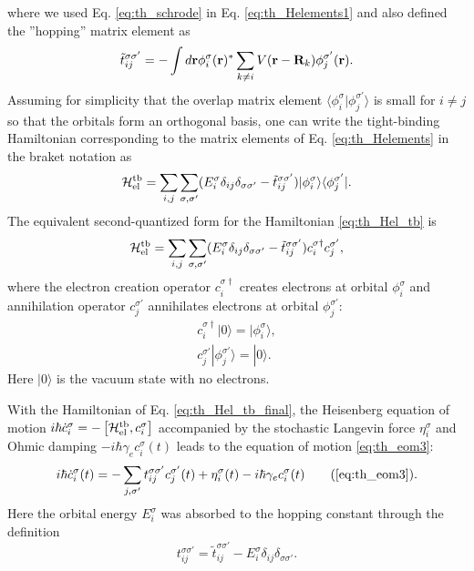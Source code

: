 where we used Eq. \eqref{eq:th_schrode} in Eq. \eqref{eq:th_Helements1} and also defined the ''hopping'' matrix element as 
\begin{equation}
  \tilde t_{ij}^{\sigma\sigma'} = - \int d\mathbf{r} \phi_i^{\sigma}(\mathbf{r})^*  \sum_{k\neq i} V(\mathbf{r}-\mathbf{R}_k)   \phi_j^{\sigma'}(\mathbf{r}).
\end{equation}
Assuming for simplicity that the overlap matrix element $\langle \phi_i^{\sigma}| \phi_j^{\sigma'} \rangle$ is small for $i\neq j$ so that the orbitals form an orthogonal basis, one can write the tight-binding Hamiltonian corresponding to the matrix elements of Eq. \eqref{eq:th_Helements} in the braket notation \cite{schwabl} as 
\begin{equation}
 \mathcal{H}_{\textrm{el}}^{\textrm{tb}} = \sum_{i,j} \sum_{\sigma,\sigma'} (E_i^{\sigma} \delta_{ij}\delta_{\sigma\sigma'}  - \tilde t_{ij}^{\sigma\sigma'})|\phi_i^{\sigma} \rangle \langle \phi_j^{\sigma'} | . \label{eq:th_Hel_tb}
\end{equation}
The equivalent second-quantized form \cite{schwabl} for the Hamiltonian \eqref{eq:th_Hel_tb} is
\begin{equation}
 \mathcal{H}_{\textrm{el}}^{\textrm{tb}} = \sum_{i,j} \sum_{\sigma,\sigma'} (E_i^{\sigma} \delta_{ij}\delta_{\sigma\sigma'}  - \tilde t_{ij}^{\sigma\sigma'}) c_i^{\sigma\dagger} c_j^{\sigma'}, \label{eq:th_Hel_tb_final}
\end{equation}
where the electron creation operator $c_i^{\sigma\dagger}$ creates electrons at orbital $\phi_i^{\sigma}$ and annihilation operator $c_j^{\sigma'}$ annihilates electrons at orbital $\phi_j^{\sigma'}$:
 \begin{subequations}
  \begin{align} 
     c_i^{\sigma\dagger} |0 \rangle = | \phi_i^{\sigma} \rangle,  \\
     c_j^{\sigma'} |\phi_j^{\sigma'} \rangle = | 0 \rangle.
  \end{align}
 \end{subequations}
Here $|0\rangle$ is the vacuum state with no electrons. 

With the Hamiltonian of Eq. \eqref{eq:th_Hel_tb_final}, the Heisenberg equation of motion $i\hbar \dot{c}_i^{\sigma} = - \left[\mathcal{H}_{\textrm{el}}^{\textrm{tb}},c_i^{\sigma} \right]$ \cite{ballentine} accompanied by the stochastic Langevin force $\eta_i^{\sigma}$ and Ohmic damping $-i\hbar \gamma_e c_i^{\sigma}(t)$ \cite{dhar03} leads to the equation of motion \eqref{eq:th_eom3}:
\begin{equation}
 i\hbar \dot{c}_i^{\sigma}(t) = -\sum_{j,\sigma'} t_{ij}^{\sigma\sigma'} c_j^{\sigma'}(t) +\eta_i^{\sigma}(t) - i\hbar \gamma_e c_i^{\sigma}(t) \tag{\ref{eq:th_eom3}}.
\end{equation}
Here the orbital energy $E_i^{\sigma}$ was absorbed to the hopping constant through the definition 
\begin{equation}
 t_{ij}^{\sigma\sigma'}=\tilde t_{ij}^{\sigma\sigma'}-E_{i}^{\sigma}\delta_{ij}\delta_{\sigma\sigma'}.
\end{equation}

